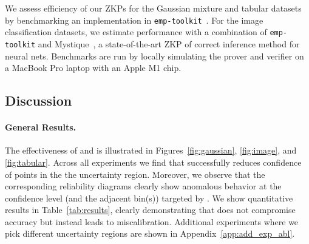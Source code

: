  We assess efficiency of our ZKPs for the Gaussian mixture and tabular datasets by benchmarking an implementation in \texttt{emp-toolkit}~\cite{emp-toolkit}. For the image classification datasets, we estimate performance with a combination of \texttt{emp-toolkit} and Mystique~\cite{weng2021mystique}, a state-of-the-art ZKP of correct inference method for neural nets. Benchmarks are run by locally simulating the prover and verifier on a MacBook Pro laptop with an Apple M1 chip. %


\subsection{Discussion}

\paragraph{General Results.}

The effectiveness of \attack and \name is illustrated in Figures~\ref{fig:gaussian}, \ref{fig:image}, and \ref{fig:tabular}. Across all experiments we find that \attack successfully reduces confidence of points in the the uncertainty region. Moreover, we observe that the corresponding reliability diagrams clearly show anomalous behavior at the confidence level (and the adjacent bin(s)) targeted by \attack. We show quantitative results in Table~\ref{tab:results}, clearly demonstrating that \attack does not compromise accuracy but instead leads to miscalibration. Additional experiments where we pick different uncertainty regions are shown in Appendix~\ref{app:add_exp_abl}. %

